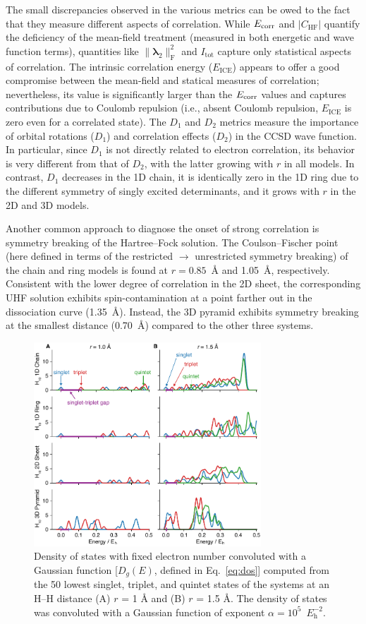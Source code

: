 \documentclass[aip,jcp,amsmath,amssymb, reprint]{revtex4-1}
\newcommand*{\Ecorr}{$E_{\rm{corr}}$\xspace}
\newcommand*{\RCMnorm}{$\norm{\pmb{\lambda}_{2}}^{2}_\mathrm{F}$\xspace}
\providecommand{\norm}[1]{\lVert#1\rVert}
\begin{document}
The small discrepancies observed in the various metrics can be owed to the fact that they measure different aspects of correlation. 
While \Ecorr and  $|C_\mathrm{HF}|$ quantify the deficiency of the mean-field treatment (measured in both energetic and wave function terms), quantities like \RCMnorm and $I_\mathrm{tot}$ capture only statistical aspects of correlation.
The intrinsic correlation energy ($E_\mathrm{ICE}$) appears to offer a good compromise between the mean-field and statical measures of correlation; nevertheless, its value is significantly larger than the \Ecorr values and captures contributions due to Coulomb repulsion (i.e., absent Coulomb repulsion, $E_\mathrm{ICE}$ is zero even for a correlated state).
The $D_1$ and $D_2$ metrics measure the importance of orbital rotations ($D_1$) and correlation effects ($D_2$) in the CCSD wave function.
In particular, since $D_1$ is not directly related to electron correlation, its behavior is very different from that of $D_2$, with the latter growing with $r$ in all models.
In contrast, $D_1$ decreases in the 1D chain, it is identically zero in the 1D ring due to the different symmetry of singly excited determinants, and it grows with $r$ in the 2D and 3D models.

Another common approach to diagnose the onset of strong correlation is symmetry breaking of the Hartree--Fock solution.
The Coulson--Fischer point (here defined in terms of the restricted $\rightarrow$ unrestricted symmetry breaking) of the chain and ring models is found at $r=0.85$~{\AA} and 1.05~{\AA}, respectively.
Consistent with the lower degree of correlation in the 2D sheet, the corresponding UHF solution exhibits spin-contamination at a point farther out in the dissociation curve (1.35~{\AA}).
Instead,  the 3D pyramid exhibits symmetry breaking at the smallest distance (0.70~{\AA}) compared  to the other three systems.

\begin{figure}[bth]
\centering
\includegraphics[width=3.35in]{figure_2.pdf}
\caption{Density of states with fixed electron number convoluted with a  Gaussian function [$D_g(E)$, defined in Eq.~\eqref{eq:dos}] computed from the 50 lowest singlet, triplet, and quintet states of the  systems at an H--H distance (A) $r$ = 1 {\AA} and (B) $r$ = 1.5 {\AA}.
The density of states was convoluted with a Gaussian function of exponent $\alpha=10^5$~$E_\mathrm{h}^{-2}$.
}
\label{fig:spectra}
\end{figure} 
\end{document}
